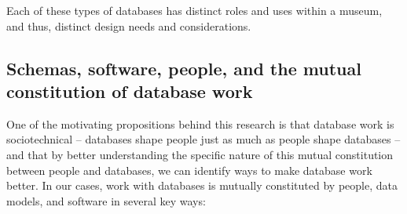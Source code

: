 Each of these types of databases has distinct roles and uses within a museum, and thus, distinct design needs and considerations. 


\subsection{Schemas, software, people, and the mutual constitution of database work}

One of the motivating propositions behind this research is that database work is sociotechnical -- databases shape people just as much as people shape databases -- and that by better understanding the specific nature of this mutual constitution between people and databases, we can identify ways to make database work better. In our cases, work with databases is mutually constituted by people, data models, and software in several key ways: 

